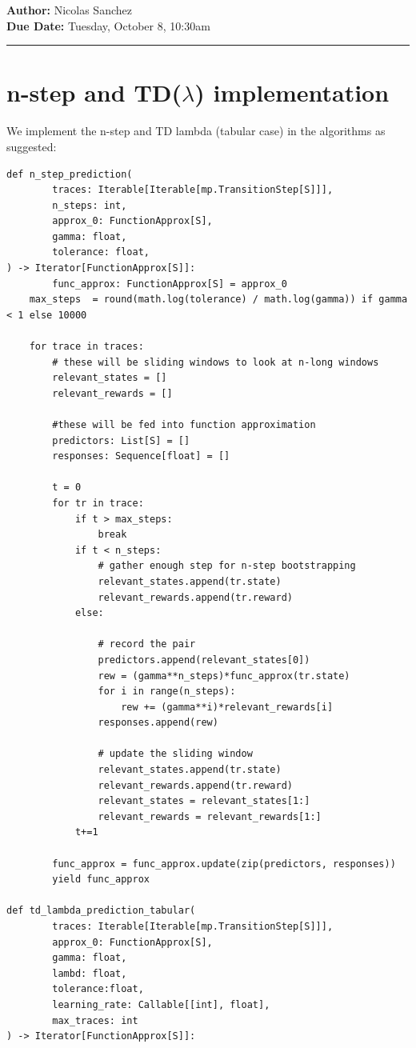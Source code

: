 \documentclass{article}[12pt]
\newcommand{\headings}[4]{\noindent {\bf Assignment 12 CME241} \hfill {{\bf Author:} Nicolas Sanchez} \\
{} \hfill {{\bf Due Date:} #2} \\

\rule[0.1in]{\textwidth}{0.025in}
}
\begin{document}
\headings{\#1}{Tuesday, October 8, 10:30am}\section{} 



\section{n-step and TD($\lambda$) implementation}
We implement the n-step and TD lambda (tabular case) in the algorithms as suggested:

\begin{lstlisting}
def n_step_prediction(
        traces: Iterable[Iterable[mp.TransitionStep[S]]],
        n_steps: int,
        approx_0: FunctionApprox[S],
        gamma: float,
        tolerance: float,
) -> Iterator[FunctionApprox[S]]:
        func_approx: FunctionApprox[S] = approx_0
    max_steps  = round(math.log(tolerance) / math.log(gamma)) if gamma < 1 else 10000

    for trace in traces:
        # these will be sliding windows to look at n-long windows
        relevant_states = []
        relevant_rewards = []
        
        #these will be fed into function approximation
        predictors: List[S] = []
        responses: Sequence[float] = []

        t = 0
        for tr in trace:
            if t > max_steps:
                break
            if t < n_steps:
                # gather enough step for n-step bootstrapping
                relevant_states.append(tr.state)
                relevant_rewards.append(tr.reward)
            else:

                # record the pair
                predictors.append(relevant_states[0])
                rew = (gamma**n_steps)*func_approx(tr.state)
                for i in range(n_steps):
                    rew += (gamma**i)*relevant_rewards[i]
                responses.append(rew)

                # update the sliding window
                relevant_states.append(tr.state)
                relevant_rewards.append(tr.reward)
                relevant_states = relevant_states[1:]
                relevant_rewards = relevant_rewards[1:]
            t+=1

        func_approx = func_approx.update(zip(predictors, responses))
        yield func_approx
        
def td_lambda_prediction_tabular(
        traces: Iterable[Iterable[mp.TransitionStep[S]]],
        approx_0: FunctionApprox[S],
        gamma: float,
        lambd: float,
        tolerance:float,
        learning_rate: Callable[[int], float],
        max_traces: int
) -> Iterator[FunctionApprox[S]]:


\end{lstlisting}
\end{document}

